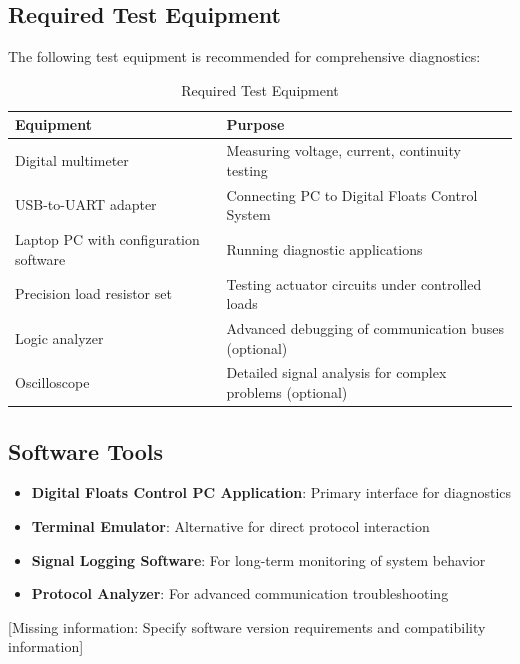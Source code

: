 \documentclass[12pt,a4paper,twoside,openright]{book}
\newcommand{\tabletextfont}{\normalfont\rmfamily}
\newcommand{\tableheadfont}{\normalfont\bfseries}
\begin{document}
\subsection{Required Test Equipment}

The following test equipment is recommended for comprehensive diagnostics:

\begin{table}[h]
\centering
\setlength{\tabcolsep}{5pt} %
\begin{tabular}{|p{}|p{}|}
\hline
\tableheadfont\textbf{Equipment} & \tableheadfont\textbf{Purpose} \\
\hline
\tabletextfont Digital multimeter & Measuring voltage, current, continuity testing \\
\hline
\tabletextfont USB-to-UART adapter & Connecting PC to Digital Floats Control System \\
\hline
\tabletextfont Laptop PC with configuration software & Running diagnostic applications \\
\hline
\tabletextfont Precision load resistor set & Testing actuator circuits under controlled loads \\
\hline
\tabletextfont Logic analyzer & Advanced debugging of communication buses (optional) \\
\hline
\tabletextfont Oscilloscope & Detailed signal analysis for complex problems (optional) \\
\hline
\end{tabular}
\caption{Required Test Equipment}
\end{table}

\subsection{Software Tools}

\begin{itemize}
    \item \textbf{Digital Floats Control PC Application}: Primary interface for diagnostics
    \item \textbf{Terminal Emulator}: Alternative for direct protocol interaction
    \item \textbf{Signal Logging Software}: For long-term monitoring of system behavior
    \item \textbf{Protocol Analyzer}: For advanced communication troubleshooting
\end{itemize}

{\color{missingred}[Missing information: Specify software version requirements and compatibility information]}
\end{document}
